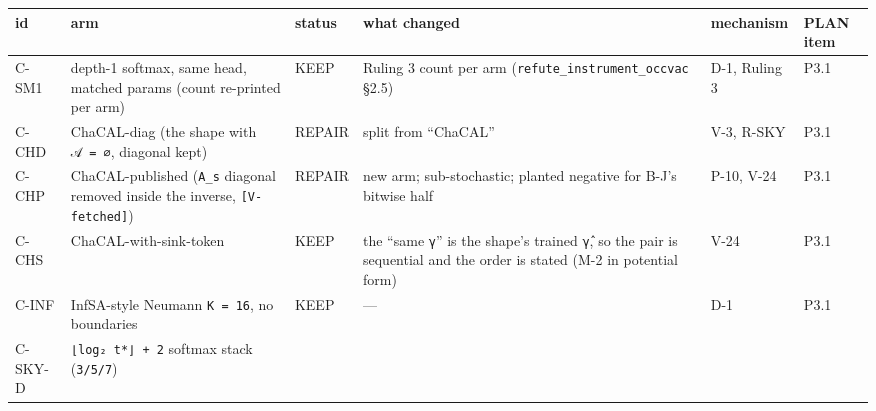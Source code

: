 \documentclass[11pt,a4paper]{article}
\newcounter{none}                 %
\theoremstyle{plain}
\theoremstyle{definition}
\theoremstyle{remark}
\begin{document}
{\def\LTcaptype{none} %
\begin{longtable}[]{@{}
  >{\raggedright\arraybackslash}p{}
  >{\raggedright\arraybackslash}p{}
  >{\raggedright\arraybackslash}p{}
  >{\raggedright\arraybackslash}p{}
  >{\raggedright\arraybackslash}p{}
  >{\raggedright\arraybackslash}p{}@{}}
\toprule\noalign{}
\begin{minipage}[b]{\linewidth}\raggedright
id
\end{minipage} & \begin{minipage}[b]{\linewidth}\raggedright
arm
\end{minipage} & \begin{minipage}[b]{\linewidth}\raggedright
status
\end{minipage} & \begin{minipage}[b]{\linewidth}\raggedright
what changed
\end{minipage} & \begin{minipage}[b]{\linewidth}\raggedright
mechanism
\end{minipage} & \begin{minipage}[b]{\linewidth}\raggedright
PLAN item
\end{minipage} \\
\midrule\noalign{}
\endhead
\bottomrule\noalign{}
\endlastfoot
C-SM1 & depth-1 softmax, same head, matched params (count re-printed per
arm) & KEEP & Ruling 3 count per arm
(\texttt{refute\_instrument\_occvac} §2.5) & D-1, Ruling 3 & P3.1 \\
C-CHD & ChaCAL-diag (the shape with \texttt{𝒜\ =\ ∅}, diagonal kept) &
REPAIR & split from ``ChaCAL'' & V-3, R-SKY & P3.1 \\
C-CHP & ChaCAL-published (\texttt{A\_s} diagonal removed inside the
inverse, \texttt{{[}V-fetched{]}}) & REPAIR & new arm; sub-stochastic;
planted negative for B-J's bitwise half & P-10, V-24 & P3.1 \\
C-CHS & ChaCAL-with-sink-token & KEEP & the ``same \texttt{γ}'' is the
shape's trained \texttt{γ̂}, so the pair is sequential and the order is
stated (M-2 in potential form) & V-24 & P3.1 \\
C-INF & InfSA-style Neumann \texttt{K\ =\ 16}, no boundaries & KEEP &
--- & D-1 & P3.1 \\
C-SKY-D & \texttt{⌊log₂\ t*⌋\ +\ 2} softmax stack (\texttt{3/5/7}) &

\end{longtable}}
\end{document}
